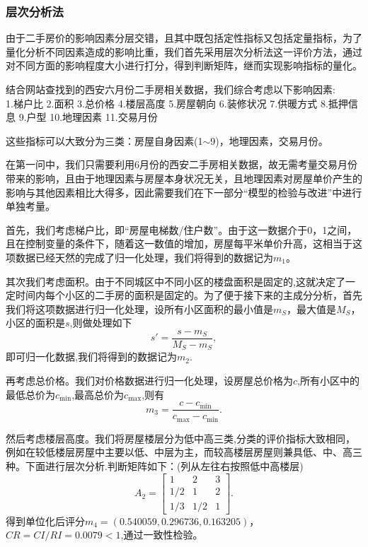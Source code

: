 \documentclass[withoutpreface,bwprint]{cumcmthesis} %
\begin{document}
\subsubsection{层次分析法}
由于二手房价的影响因素分层交错，且其中既包括定性指标又包括定量指标，为了量化分析不同因素造成的影响比重，我们首先采用层次分析法这一评价方法，通过对不同方面的影响程度大小进行打分，得到判断矩阵，继而实现影响指标的量化。


结合网站查找到的西安六月份二手房相关数据，我们综合考虑以下影响因素:\\
1.梯户比
2.面积
3.总价格
4.楼层高度
5.房屋朝向
6.装修状况
7.供暖方式
8.抵押信息
9.户型
10.地理因素
11.交易月份

这些指标可以大致分为三类：房屋自身因素(1$\sim$9)，地理因素，交易月份。

在第一问中，我们只需要利用6月份的西安二手房相关数据，故无需考量交易月份带来的影响，且由于地理因素与房屋本身状况无关，且地理因素对房屋单价产生的影响与其他因素相比大得多，因此需要我们在下一部分“模型的检验与改进”中进行单独考量。

首先，我们考虑梯户比，即“房屋电梯数/住户数”。由于这一数据介于0，1之间，且在控制变量的条件下，随着这一数值的增加，房屋每平米单价升高，这相当于这项数据已经天然的完成了归一化处理，我们将得到的数据记为$m_1$。

其次我们考虑面积。由于不同城区中不同小区的楼盘面积是固定的,这就决定了一定时间内每个小区的二手房的面积是固定的。为了便于接下来的主成分分析，首先我们将这项数据进行归一化处理，设所有小区面积的最小值是$m_S$，最大值是$M_S$，小区的面积是$s$,则做处理如下
\begin{equation}
    s'=\frac{s-m_S}{M_S-m_S},
\end{equation}
即可归一化数据,我们将得到的数据记为$m_2$.

再考虑总价格。我们对价格数据进行归一化处理，设房屋总价格为$c$,所有小区中的最低总价为$c_{\min}$,最高总价为$c_{\max}$,则有
\begin{equation}
    m_3=\frac{c-c_{\min}}{c_{\max}-c_{\min}}.
\end{equation}

然后考虑楼层高度。我们将房屋楼层分为低中高三类,分类的评价指标大致相同，例如在较低楼层房屋中主要以低、中层为主，而较高楼层房屋则兼具低、中、高三种。下面进行层次分析.判断矩阵如下：(列从左往右按照低中高楼层)
\begin{equation}
    A_2=\begin{bmatrix}
        1 & 2 &3 \\
        1/2 & 1 &2\\
        1/3 & 1/2 & 1
    \end{bmatrix}.
\end{equation}
得到单位化后评分$m_4=(0.540059,0.296736,0.163205)$，
$CR=CI/RI=0.0079<1$,通过一致性检验。
\end{document}

